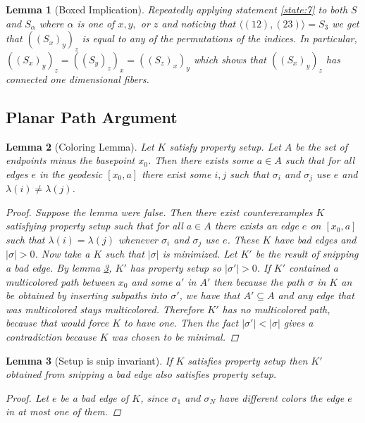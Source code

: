 \documentclass{article}
\newcommand{\sxyz}{((S_x)_y)_z}
\newcommand{\Sxyz}[3]{((S_#1)_#2)_#3}
\theoremstyle{mystyle}
\newtheorem{lem}{Lemma}[section]
\theoremstyle{remark}
\begin{document}
\begin{lem}
    [Boxed Implication]
 \label{lem:boximp} 
    Repeatedly applying statement \ref{state:7} to both \(S\) and \(S_{\alpha}\) where \(\alpha\) is one of \(x,y,\) or \(z\)  and noticing that \(\langle (12),(23) \rangle = S_{3}\) we get that \(\sxyz\) is equal to any of the permutations of the indices. In particular, \(\Sxyz{x}{y}{z}=\Sxyz{y}{z}{x}=\Sxyz{z}{x}{y}\) which shows that \(\sxyz\) has connected one dimensional fibers.
\end{lem}
\subsection{Planar Path Argument}

 \label{lem:ppa} 
\begin{lem}[Coloring Lemma]
    \label{lem:coloring} 
    Let \(K\) satisfy property setup. Let \(A\) be the set of endpoints minus the basepoint \(x_{ 0}\). Then there exists some \(a \in A\) such that for all edges \(e\) in the geodesic \([x_{0} , a]\) there exist some \(i, j\) such that \(\sigma_{i}\) and \(\sigma_{j}\) use \(e\) and \(\lambda ( i ) \neq \lambda ( j )\).
    \begin{proof}
        Suppose the lemma were false. Then there exist counterexamples \(K\) satisfying property setup such that for all \(a \in A\) there exists an edge \(e\) on \([x_{0} , a]\) such that \(\lambda (i)= \lambda (j)\) whenever \(\sigma_{i}\) and \(\sigma_{j}\) use \(e\). These \(K\) have bad edges and \(| \sigma | > 0 \). Now take a \(K\) such that \(| \sigma |\) is minimized. Let \(K'\) be the result of snipping a bad edge. By lemma \ref{lem:preservesetup}, \(K'\) has property setup so \(| \sigma ' | > 0\). If \(K'\) contained a multicolored path between \(x_{0}\) and some \(a'\) in \(A'\) then because the path \(\sigma\) in \(K\) an be obtained by inserting subpaths into \(\sigma '\), we have that \(A' \subseteq A\) and any edge that was multicolored stays multicolored. Therefore \(K'\) has no multicolored path, because that would force \(K\) to have one. Then the fact \(| \sigma' | < | \sigma |\) gives a contradiction because \(K\) was chosen to be minimal. 
        
        
    
        
    \end{proof}
\end{lem}


\begin{lem}
    [Setup is snip invariant]
 \label{lem:preservesetup} 
    If \(K\) satisfies property setup then \(K'\) obtained from snipping a bad edge also satisfies property setup.
    \begin{proof}
        Let \(e\) be a bad edge of \(K\), since \(\sigma_{1}\) and \(\sigma_{N}\) have different colors the edge \(e\) in at most one of them. 
    \end{proof}
\end{lem}
\end{document}
